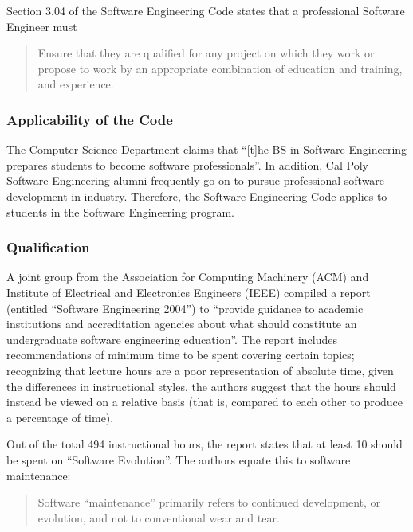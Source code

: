 \documentclass[11pt]{article}
\begin{document}
\begin{multicols}{2}
Section 3.04 of the Software Engineering Code states that a professional Software Engineer must

\begin{quote}
Ensure that they are qualified for any project on which they work or propose to work by an appropriate combination of education and training, and experience. \cite{secode}
\end{quote}

\subsubsection{Applicability of the Code}

The Computer Science Department claims that ``[t]he BS in Software Engineering prepares students to become software professionals''. \cite{catalogDept}  In addition, Cal Poly Software Engineering alumni frequently go on to pursue professional software development in industry. \cite{polyAlums}  Therefore, the Software Engineering Code applies to students in the Software Engineering program.

\subsubsection{Qualification}

A joint group from the Association for Computing Machinery (ACM) and Institute of Electrical and Electronics Engineers (IEEE) compiled a report (entitled ``Software Engineering 2004'') to ``provide guidance to academic institutions and accreditation agencies about what should constitute an undergraduate software engineering education''. \cite{se2004}  The report includes recommendations of minimum time to be spent covering certain topics; recognizing that lecture hours are a poor representation of absolute time, given the differences in instructional styles, the authors suggest that the hours should instead be viewed on a relative basis (that is, compared to each other to produce a percentage of time).

Out of the total 494 instructional hours, the report states that at least 10 should be spent on ``Software Evolution''.  The authors equate this to software maintenance:

\begin{quote}
Software ``maintenance'' primarily refers to continued development, or evolution, and not to conventional wear and tear. \cite{se2004}
\end{quote}


\end{multicols}
\end{document}
